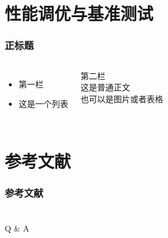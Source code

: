 \documentclass{beamer}
\begin{document}
\section{性能调优与基准测试}
\begin{frame}
    \frametitle{正标题}
    \begin{columns}
        \begin{itemize}
            \item 第一栏
            \item 这是一个列表
        \end{itemize}
        第二栏\\
        这是普通正文\\
        也可以是图片或者表格
    \end{columns}
\end{frame}

\section{参考文献}

\begin{frame}[allowframebreaks]
    \frametitle{参考文献}
    \small
    
    
\end{frame}

\section*{}


\begin{frame}
    \centering
    \Huge Q \& A
         
\end{frame}
\end{document}
